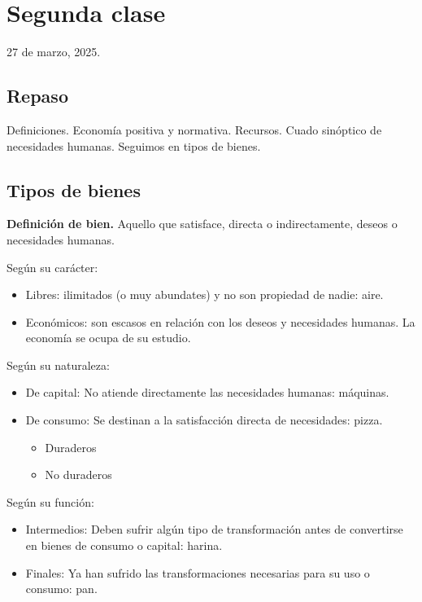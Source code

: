 \section{Segunda clase}

27 de marzo, 2025.

\subsection{Repaso}

Definiciones. Economía positiva y normativa.
Recursos.
Cuado sinóptico de necesidades humanas.
Seguimos en tipos de bienes.

\subsection{Tipos de bienes}

\textbf{Definición de bien.}
Aquello que satisface, directa o indirectamente, deseos o necesidades humanas.

Según su carácter:
\begin{itemize}
    \item Libres: ilimitados (o muy abundates) y no son propiedad de nadie: aire.
    \item Económicos: son escasos en relación con los deseos y necesidades humanas.
    La economía se ocupa de su estudio.
\end{itemize}

Según su naturaleza:
\begin{itemize}
    \item De capital: 
    No atiende directamente las necesidades humanas:
    máquinas.
    \item De consumo:
    Se destinan a la satisfacción directa de necesidades:
    pizza.
    \begin{itemize}
        \item Duraderos
        \item No duraderos
    \end{itemize}
\end{itemize}

Según su función:
\begin{itemize}
    \item Intermedios:
    Deben sufrir algún tipo de transformación antes de convertirse en bienes de consumo o capital: harina.
    \item Finales:
    Ya han sufrido las transformaciones necesarias para su uso o consumo: pan.
\end{itemize}

